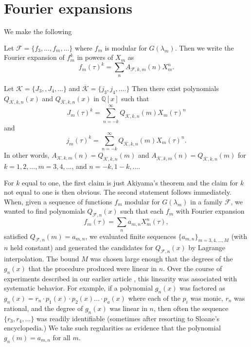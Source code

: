 \documentclass{article}
\begin{document}
 \section{Fourier expansions}
 \noindent
 We make the following 
 \begin{definition}
 Let $\mathcal{F} = \{f_3, ..., f_m, ...\}$
 where $f_m$ is modular for $G(\lambda_m)$.
 Then we write the Fourier expansion
 of $f_m^k$ in powers of $X_m$ as
$$
f_m(\tau)^k = \sum_n A_{\mathcal{F},k,m}(n)X_m^n.
$$
 \end{definition} \noindent
\begin{proposition}
Let 
$\mathcal{K} =
\{J_3, , J_4,...\}$
and $\overline{\mathcal{K}} =
\{j_3, j_4,....\}$
Then there exist polynomials
$Q_{\mathcal{K},k,n}(x)$ and
$Q_{\overline{\mathcal{K}},k,n}(x)$
in $\mathbb{Q}[x]$
such that 
$$J_m(\tau)^k = 
\sum_{n = -k}^{\infty} 
Q_{\mathcal{K},k,n}(m) X_m(\tau)^n$$ and
$$j_m(\tau)^k = 
\sum_{n = -k}^{\infty} 
Q_{\overline{\mathcal{K}},k,n}(m) 
X_m(\tau)^n.$$
In other words,
$A_{\mathcal{K},k,m}(n) = Q_{\mathcal{K},k,n}(m)$
and 
$A_{\overline{\mathcal{K}},k,m}(n) = 
Q_{\overline{\mathcal{K}},k,n}(m)$
for $k = 1, 2, ..., m = 3, 4, ...$,
and $n = -k, 1-k, ....$
\end{proposition} 
\noindent
For $k$ equal to one, 
the first claim is
just Akiyama's theorem and
the claim for $k$ not equal to
one is then obvious.
The second statement 
follows immediately.
\newline \newline \noindent
When, given  a sequence of functions
$f_m$ modular for  $G(\lambda_m)$ 
in a family $\mathcal{F}$,
we wanted to find polynomials
$Q_{\mathcal{F},n}(x)$
such that each $f_m$
with Fourier expansion
$$
f_m(\tau) = \sum_n  a_{m,n} X_m^n(\tau),
$$
satisfied $Q_{\mathcal{F},n}(m) = a_{m,n}$,
we evaluated
finite sequences
$\{a_{m,n}\}_{m = 3, 4, ...,M}$
 (with $n$ held constant)
and generated the candidates
for $Q_{\mathcal{F},n}(x)$
by Lagrange interpolation.
The bound $M$ was 
chosen large enough that
the degrees of the $g_n(x)$
that the procedure produced were
linear in $n$.
Over the
course of experiments described in
our earlier article \cite{interpolating}, 
this linearity 
was associated with systematic behavior.
For example, if a polynomial $g_n(x)$
was factored as 
$g_n(x) = 
r_n\cdot p_1(x) \cdot p_2(x)...\cdot p_a(x)$
where each of the $p_i$ was monic, $r_n$
was rational, and the degree of $g_n(x)$
was linear in $n$, then often the sequence
$\{r_3, r_4, ...\}$ was readily identifiable
(sometimes after resorting to Sloane's
encyclopedia.) We take such regularities
as evidence that the polynomial $g_n(m) =
a_{m,n}$ for all $m$.
\end{document}

